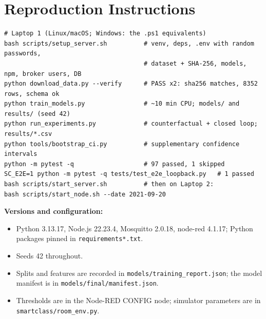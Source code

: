\documentclass[12pt,a4paper,oneside]{report}
\begin{document}
\chapter{Reproduction Instructions}
{\footnotesize
\begin{verbatim}
# Laptop 1 (Linux/macOS; Windows: the .ps1 equivalents)
bash scripts/setup_server.sh          # venv, deps, .env with random passwords,
                                      # dataset + SHA-256, models, npm, broker users, DB
python download_data.py --verify      # PASS x2: sha256 matches, 8352 rows, schema ok
python train_models.py                # ~10 min CPU; models/ and results/ (seed 42)
python run_experiments.py             # counterfactual + closed loop; results/*.csv
python tools/bootstrap_ci.py          # supplementary confidence intervals
python -m pytest -q                   # 97 passed, 1 skipped
SC_E2E=1 python -m pytest -q tests/test_e2e_loopback.py   # 1 passed
bash scripts/start_server.sh          # then on Laptop 2:
bash scripts/start_node.sh --date 2021-09-20
\end{verbatim}
}

\textbf{Versions and configuration:}
\begin{itemize}
\item Python 3.13.17, Node.js 22.23.4, Mosquitto 2.0.18, node-red 4.1.17; Python packages pinned in
  \texttt{requirements*.txt}.
\item Seeds 42 throughout.
\item Splits and features are recorded in \texttt{models/training\_report.json}; the model manifest is in
  \texttt{models/final/manifest.json}.
\item Thresholds are in the Node-RED CONFIG node; simulator parameters are in \texttt{smartclass/room\_env.py}.
\end{itemize}
\end{document}
